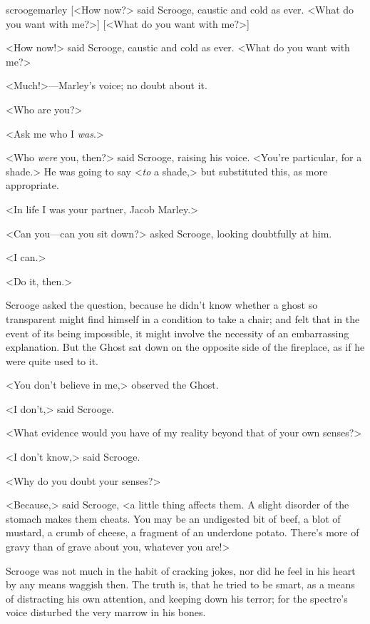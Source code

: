 \begin{colorbigpic}
	[\basicscale]
	{scroogemarley}
	[<How now?> said Scrooge, caustic and cold as ever. <What do you want with me?>]
	[<What do you want with me?>]
\end{colorbigpic}


<How now!> said Scrooge, caustic and cold as ever. <What do you want with me?>

<Much!>—Marley's voice; no doubt about it.

<Who are you?>

<Ask me who I \textit{was}.>

<Who \textit{were} you, then?> said Scrooge, raising his voice. <You're particular, for a shade.> He was going to say <\textit{to} a shade,> but substituted this, as more appropriate.

<In life I was your partner, Jacob Marley.>

<Can you—can you sit down?> asked Scrooge, looking doubtfully at him.

<I can.>

<Do it, then.>

Scrooge asked the question, because he didn't know whether a ghost so transparent might find himself in a condition to take a chair; and felt that in the event of its being impossible, it might involve the necessity of an embarrassing explanation. But the Ghost sat down on the opposite side of the fireplace, as if he were quite used to it.

<You don't believe in me,> observed the Ghost.

<I don't,> said Scrooge.

<What evidence would you have of my reality beyond that of your own senses?>

<I don't know,> said Scrooge.

<Why do you doubt your senses?>

<Because,> said Scrooge, <a little thing affects them. A slight disorder of the stomach makes them cheats. You may be an undigested bit of beef, a blot of mustard, a crumb of cheese, a fragment of an underdone potato. There's more of gravy than of grave about you, whatever you are!>

Scrooge was not much in the habit of cracking jokes, nor did he feel in his heart by any means waggish then. The truth is, that he tried to be smart, as a means of distracting his own attention, and keeping down his terror; for the spectre's voice disturbed the very marrow in his bones.

